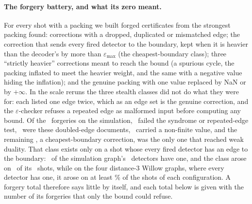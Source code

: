 \documentclass[aps,pra,twocolumn,superscriptaddress,nofootinbib,longbibliography,floatfix]{revtex4-2}
\newcommand{\eps}{\varepsilon}
\begin{document}
\paragraph*{The forgery battery, and what its zero meant.} For every shot with a packing we built forged certificates from the strongest packing found: corrections with a dropped, duplicated or mismatched edge; the correction that sends every fired detector to the boundary, kept when it is heavier than the decoder's by more than $\eps_{\max}$ (the cheapest-boundary class); three ``strictly heavier'' corrections meant to reach the bound (a spurious cycle, the packing inflated to meet the heavier weight, and the same with a negative value hiding the inflation); and the genuine packing with one value replaced by NaN or by $+\infty$. In the scale reruns the three stealth classes did not do what they were for: each listed one edge twice, which as an edge set is the genuine correction, and the $\eps$-checker refuses a repeated edge as malformed input before computing any bound. Of the \EpsSimForgeries\ forgeries on the simulation, \EpsSimForgeriesSyndrome\ failed the syndrome or repeated-edge test, \EpsSimForgeriesDoubled\ were these doubled-edge documents, \EpsSimForgeriesNonFinite\ carried a non-finite value, and the remaining \EpsSimForgeriesBound, a cheapest-boundary correction, was the only one that reached weak duality. That class exists only on a shot whose every fired detector has an edge to the boundary: \SimBoundaryDetectors\ of the simulation graph's \SimDetectors\ detectors have one, and the class arose on \EpsSimForgeriesBound\ of its \EpsSimNontrivial\ shots, while on the four distance-3 Willow graphs, where every detector has one, it arose on at least \WThreeBoundaryMinPct\% of the shots of each configuration. A forgery total therefore says little by itself, and each total below is given with the number of its forgeries that only the bound could refuse.
\end{document}
